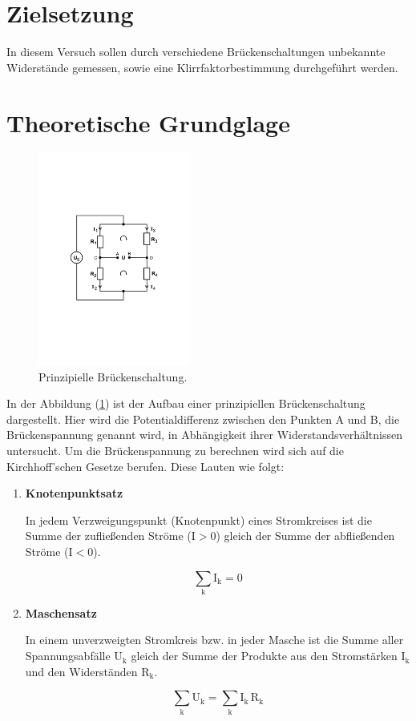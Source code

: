 \section{Zielsetzung}

In diesem Versuch sollen durch verschiedene Brückenschaltungen unbekannte Widerstände gemessen, 
sowie eine Klirrfaktorbestimmung durchgeführt werden.

\section{Theoretische Grundglage}

\begin{figure}
            \centering
               \includegraphics[height=7cm]{Bilder/prinz.pdf}
               \caption{Prinzipielle Brückenschaltung.}
               \label{fig:prinz}
        \end{figure}

\noindent 
In der Abbildung (\ref{fig:prinz}) ist der Aufbau einer prinzipiellen Brückenschaltung dargestellt.
Hier wird die Potentialdifferenz zwischen den Punkten A und B, die Brückenspannung genannt wird, in Abhängigkeit ihrer Widerstandsverhältnissen untersucht.
Um die Brückenspannung zu berechnen wird sich auf die Kirchhoff'schen Gesetze berufen.
Diese Lauten wie folgt:

\noindent
\begin{enumerate}
\item \textbf{Knotenpunktsatz}

In jedem Verzweigungspunkt (Knotenpunkt) eines Stromkreises ist die Summe der zufließenden Ströme ($\text{I}>0$) gleich der Summe der abfließenden Ströme ($\text{I}<0$).

\begin{equation}
\sum_\text{k} \text{I}_\text{k} = 0
\label{eqn:knotenpunktsatz}
\end{equation}

\item \textbf{Maschensatz}

In einem unverzweigten Stromkreis bzw. in jeder Masche ist die Summe aller Spannungsabfälle $\text{U}_\text{k}$ 
gleich der Summe der Produkte aus den Stromstärken $\text{I}_\text{k}$ und den Widerständen $\text{R}_\text{k}$.

\begin{equation}
\sum_\text{k} \text{U}_\text{k} = \sum_\text{k} \text{I}_\text{k} \, \text{R}_\text{k}
\label{eqn:maschensatz}
\end{equation}
\end{enumerate}

